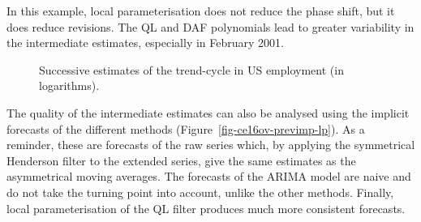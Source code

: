 \documentclass[
]{article}
\newcommand\1{\mathds{1}}
\begin{document}
In this example, local parameterisation does not reduce the phase shift,
but it does reduce revisions. The QL and DAF polynomials lead to greater
variability in the intermediate estimates, especially in February 2001.

\begin{figure}[H]

\caption{\label{fig-ce16ovlp}Successive estimates of the trend-cycle in
US employment (in logarithms).}


\end{figure}%

The quality of the intermediate estimates can also be analysed using the
implicit forecasts of the different methods
(Figure~\ref{fig-ce16ov-previmp-lp}). As a reminder, these are forecasts
of the raw series which, by applying the symmetrical Henderson filter to
the extended series, give the same estimates as the asymmetrical moving
averages. The forecasts of the ARIMA model are naive and do not take the
turning point into account, unlike the other methods. Finally, local
parameterisation of the QL filter produces much more consistent
forecasts.
\end{document}
